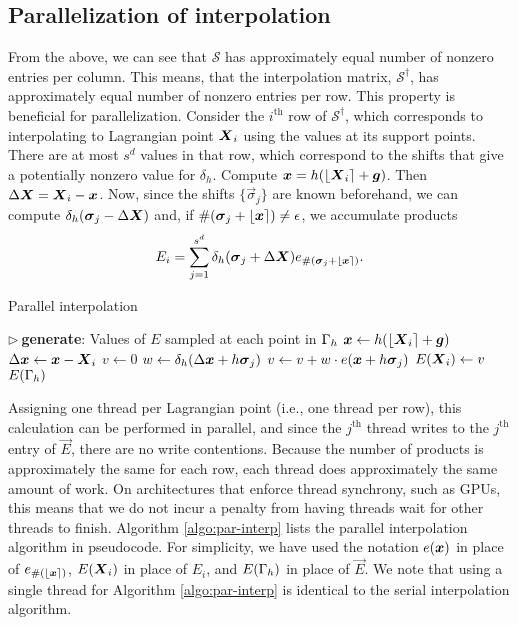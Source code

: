\subsection{Parallelization of interpolation}

From the above, we can see that $\mathcal{S}$ has approximately equal number
of nonzero entries per column. This means, that the interpolation matrix,
$\mathcal{S}^\dagger$, has approximately equal number of nonzero entries per
row. This property is beneficial for parallelization. Consider the
$i^\text{th}$ row of $\mathcal{S}^\dagger$, which corresponds to interpolating
to Lagrangian point $\boldsymbol{X}_i$ using the values at its support points. There are at
most $s^d$ values in that row, which correspond to the shifts that give a
potentially nonzero value for $\delta_h$. Compute $\boldsymbol{x} =
h(\left\lfloor{\boldsymbol{X}_i}\right\rceil+\boldsymbol{g})$. Then $\Delta\boldsymbol{X} = \boldsymbol{X}_i-\boldsymbol{x}$. Now, since the shifts
$\{\vec{\sigma}_j\}$ are known beforehand, we can compute
$\delta_h(\boldsymbol{\sigma}_j-\Delta\boldsymbol{X})$ and, if $\#(\boldsymbol{\sigma}_j+\left\lfloor{\boldsymbol{x}}\right\rceil)
\neq\epsilon$, we accumulate products
\begin{equation*}
    E_i = \sum_{j=1}^{s^d}\delta_h(\boldsymbol{\sigma}_j+\Delta\boldsymbol{X})e_{\#(\boldsymbol{\sigma}_j+\left\lfloor{\boldsymbol{x}}\right\rceil)}.
\end{equation*}

\begin{algorithm}
\caption{Parallel interpolation}
\label{algo:par-interp}
\begin{algorithmic}[1]
\State $\triangleright\ $\textbf{generate}: Values of $E$ sampled at each point in $\Gamma_h$
    \State $\boldsymbol{x} \gets h(\left\lfloor{\boldsymbol{X}_i}\right\rceil+\boldsymbol{g})$
    \State $\Delta\boldsymbol{x} \gets \boldsymbol{x}-\boldsymbol{X}_i$
    \State $v \gets 0$
        \State $w \gets \delta_h(\Delta\boldsymbol{x}+h\boldsymbol{\sigma}_j)$
            \State $v \gets v + w \cdot e(\boldsymbol{x}+h\boldsymbol{\sigma}_j)$\label{line:par-interp-acc}
        \EndIf
    \EndFor
    \State $E(\boldsymbol{X}_i) \gets v$
\EndFor
\State \Return $E(\Gamma_h)$
\EndProcedure
\end{algorithmic}
\end{algorithm}

Assigning one thread per Lagrangian point (i.e., one thread per row), this
calculation can be performed in parallel, and since the $j^\text{th}$ thread
writes to the $j^\text{th}$ entry of $\vec{E}$, there are no write contentions.
Because the number of products is approximately the same for each row, each
thread does approximately the same amount of work. On architectures that
enforce thread synchrony, such as GPUs, this means that we do not incur a
penalty from having threads wait for other threads to finish. Algorithm
\ref{algo:par-interp} lists the parallel interpolation algorithm in pseudocode. 
For simplicity, we have used the notation $e(\boldsymbol{x})$ in place of
$e_{\#(\left\lfloor{\boldsymbol{x}}\right\rceil)}$, $E(\boldsymbol{X}_i)$ in place of $E_i$, and $E(\Gamma_h)$ in place
of $\vec{E}$. We note that using a single thread for Algorithm
\ref{algo:par-interp} is identical to the serial interpolation algorithm.

